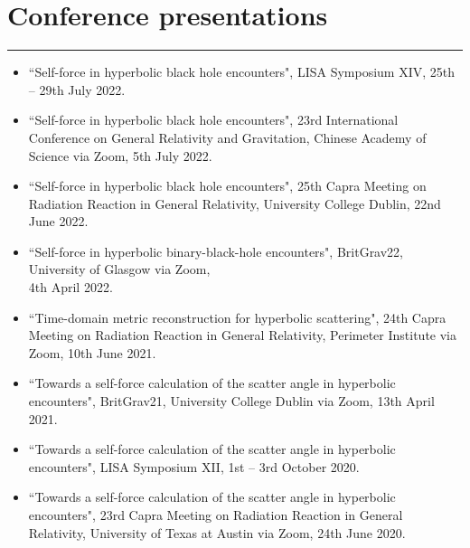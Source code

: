 \documentclass[10.5pt, oneside]{article}   	%
\begin{document}
 {\color{Sectioncolour}
\section*{Conference presentations}
\vspace{-3mm}
\noindent\rule{\linewidth}{0.6pt}}
\begin{itemize}
\item``Self-force in hyperbolic black hole encounters", LISA Symposium XIV, 25th -- 29th July 2022. \href{https://www.youtube.com/watch?v=p2-RgYB6Jhk}{}
\item ``Self-force in hyperbolic black hole encounters", 23rd International Conference on General Relativity and Gravitation, Chinese Academy of Science via Zoom, 5th July 2022. \href{https://oliverlong.info/talks/gr23}{}
\item ``Self-force in hyperbolic black hole encounters", 25th Capra Meeting on Radiation Reaction in General Relativity, University College Dublin, 22nd June 2022. \href{https://oliverlong.info/talks/capra25}{}
\item ``Self-force in hyperbolic binary-black-hole encounters", BritGrav22, University of Glasgow via Zoom, \\ 4th April 2022. \href{https://www.youtube.com/watch?v=zZEblkjb5IM}{}
\item ``Time-domain metric reconstruction for hyperbolic scattering", 24th Capra Meeting on Radiation Reaction in General Relativity, Perimeter Institute via Zoom, 10th June 2021. \href{https://pirsa.org/21060058}{}
\item ``Towards a self-force calculation of the scatter angle in hyperbolic encounters", BritGrav21, University College Dublin via Zoom, 13th April 2021. \href{https://oliverlong.info/talks/britgrav21}{}
\item``Towards a self-force calculation of the scatter angle in hyperbolic encounters", LISA Symposium XII, 1st -- 3rd October 2020. \href{https://lisasymposium13.lisamission.org/presentations/i0xMnRFWi7WKbO5f01caGDH0zPK2/7qz7uYC3qHuzj9AsC49h}{}
\item ``Towards a self-force calculation of the scatter angle in hyperbolic encounters", 23rd Capra Meeting on Radiation Reaction in General Relativity, University of Texas at Austin via Zoom, 24th June 2020. \href{https://www.youtube.com/watch?v=HB-Rw5kRUfg&t=11311s}{}
\end{itemize} 
 
\end{document}
